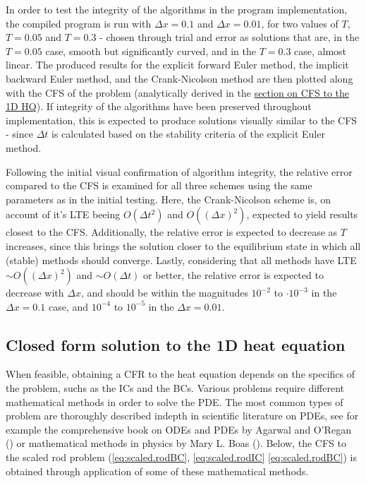 \documentclass[%
oneside,                 %
final,                   %
10pt]{article}
\begin{document}
In order to test the integrity of the algorithms in the program implementation, the compiled program is run with $\Delta x=0.1$ and $\Delta x=0.01$, for two values of $T$, $T=0.05$ and $T=0.3$ - chosen through trial and error as solutions that are, in the $T=0.05$ case, smooth but significantly curved, and in the $T=0.3$ case, almost linear. The produced results for the explicit forward Euler method, the implicit backward Euler method, and the Crank-Nicolson method are then plotted along with the CFS of the problem (analytically derived in the \hyperref[M.CFS1d]{section on CFS to the 1D HQ}). If integrity of the algorithms have been preserved throughout implementation, this is expected to produce solutions visually similar to the CFS - since $\Delta t$ is calculated based on the stability criteria of the explicit Euler method. \newline

Following the initial visual confirmation of algorithm integrity, the relative error compared to the CFS is examined for all three schemes using the same parameters as in the initial testing. Here, the Crank-Nicolson scheme is, on account of it's LTE beeing $O(\Delta t^2)$ and $O((\Delta x)^2)$, expected to yield results closest to the CFS. Additionally, the relative error is expected to decrease as $T$ increases, since this brings the solution closer to the equilibrium state in which all (stable) methods should converge. Lastly, considering that all methods have LTE $\sim O((\Delta x)^2)$ and $\sim O(\Delta t)$ or better, the relative error is expected to decrease with $\Delta x$, and should be within the magnitudes $ 10^{-2}$ to $\cdot 10^{-3}$  in the $\Delta x=0.1$ case, and $10^{-4}$ to $10^{-5}$ in the $\Delta x=0.01$.


\subsection{Closed form solution to the 1D heat equation}
\label{M.CFS1d}
When feasible, obtaining a CFR to the heat equation depends on the specifics of the problem, suchs as the ICs and the BCs. Various problems require different mathematical methods in order to solve the PDE. The most common types of problem are thoroughly described indepth in scientific literature on PDEs, see for example the comprehensive book on ODEs and PDEs by Agarwal and O’Regan (\cite{ravi}) or mathematical methods in physics by Mary L. Boas (\cite{matmet}). Below, the CFS to the scaled rod problem (\eqref{eq:scaled.rodBC}, \eqref{eq:scaled.rodIC} \eqref{eq:scaled.rodBC}) is obtained through  application of some of these mathematical methods. \newline
\end{document}
